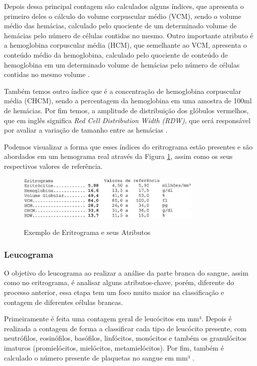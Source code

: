 Depois dessa principal contagem são calculados alguns índices, que apresenta o primeiro deles o cálculo do volume corpuscular médio (VCM), sendo o volume médio das hemácias, calculado pelo quociente de um determinado volume de hemácias pelo número de células contidas no mesmo. Outro importante atributo é a hemoglobina corpuscular média (HCM), que semelhante ao VCM, apresenta o conteúdo médio da hemoglobina, calculado pelo quociente de conteúdo de hemoglobina em um determinado volume de hemácias pelo número de células contidas no mesmo volume \cite{interpretacaoHemograma, manualHematologia}.

Também temos outro índice que é a concentração de hemoglobina corpuscular média (CHCM), sendo a percentagem da hemoglobina em uma amostra de 100ml de hemácias. Por fim temos, a amplitude de distribuição dos glóbulos vermelhos, que em inglês significa \emph{Red Cell Distribution Width (RDW)}, que será responsável por avaliar a variação de tamanho entre as hemácias \cite{interpretacaoHemograma, manualHematologia}.

Podemos visualizar a forma que esses índices do eritrograma estão presentes e são abordados em um hemograma real através da Figura \ref{fig:eritrograma}, assim como os seus respectivos valores de referência.

\begin{figure}[!htb]
	\centering
	\caption{Exemplo de Eritrograma e seus Atributos}
	\includegraphics[width=0.80\textwidth]{img/eritrograma.jpg}
	\label{fig:eritrograma}
\end{figure}
 
\subsubsection{Leucograma}
O objetivo do leucograma ao realizar a análise da parte branca do sangue, assim como no eritrograma, é analisar alguns atributos-chave, porém, diferente do processo anterior, essa etapa tem um foco muito maior na classificação e contagem de diferentes células brancas.

Primeiramente é feita uma contagem geral de leucócitos em mm³. Depois é realizada a contagem de forma a classificar cada tipo de leucócito presente, com neutrófilos, eosinófilos, basófilos, linfócitos, monócitos e também os granulócitos imaturos (promielócitos, mielócitos, metamielócitos). Por fim, também é calculado o número presente de plaquetas no sangue em mm³ \cite{interpretacaoHemograma, manualHematologia}.


